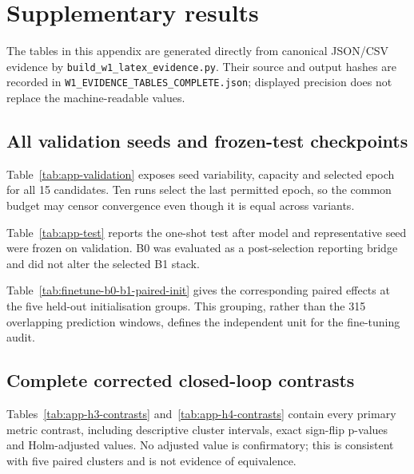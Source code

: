 \section{Supplementary results}
\label{app:supplementary}

The tables in this appendix are generated directly from canonical JSON/CSV
evidence by \texttt{build\_w1\_latex\_evidence.py}. Their source and output
hashes are recorded in \texttt{W1\_EVIDENCE\_TABLES\_COMPLETE.json}; displayed
precision does not replace the machine-readable values.

\subsection{All validation seeds and frozen-test checkpoints}

Table~\ref{tab:app-validation} exposes seed variability, capacity and selected
epoch for all 15 candidates. Ten runs select the last permitted epoch, so the
common budget may censor convergence even though it is equal across variants.



Table~\ref{tab:app-test} reports the one-shot test after model and representative
seed were frozen on validation. B0 was evaluated as a post-selection reporting
bridge and did not alter the selected B1 stack.



Table~\ref{tab:finetune-b0-b1-paired-init} gives the corresponding paired
effects at the five held-out initialisation groups. This grouping, rather than
the 315 overlapping prediction windows, defines the independent unit for the
fine-tuning audit.



\subsection{Complete corrected closed-loop contrasts}

Tables~\ref{tab:app-h3-contrasts} and~\ref{tab:app-h4-contrasts} contain every
primary metric contrast, including descriptive cluster intervals, exact
sign-flip p-values and Holm-adjusted values. No adjusted value is confirmatory;
this is consistent with five paired clusters and is not evidence of
equivalence.

